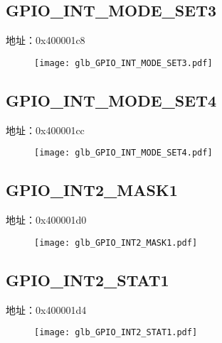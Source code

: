 \subsection{GPIO\_INT\_MODE\_SET3}
\label{glb-GPIO-INT-MODE-SET3}
地址：0x400001c8
 \begin{figure}[H]
\texttt{[image: glb\_GPIO\_INT\_MODE\_SET3.pdf]}
\end{figure}

\subsection{GPIO\_INT\_MODE\_SET4}
\label{glb-GPIO-INT-MODE-SET4}
地址：0x400001cc
 \begin{figure}[H]
\texttt{[image: glb\_GPIO\_INT\_MODE\_SET4.pdf]}
\end{figure}

\subsection{GPIO\_INT2\_MASK1}
\label{glb-GPIO-INT2-MASK1}
地址：0x400001d0
 \begin{figure}[H]
\texttt{[image: glb\_GPIO\_INT2\_MASK1.pdf]}
\end{figure}

\subsection{GPIO\_INT2\_STAT1}
\label{glb-GPIO-INT2-STAT1}
地址：0x400001d4
 \begin{figure}[H]
\texttt{[image: glb\_GPIO\_INT2\_STAT1.pdf]}
\end{figure}

